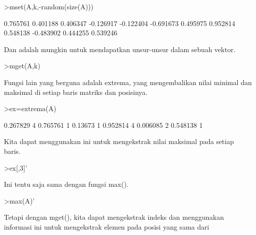\documentclass[a4paper,10pt]{article}
\begin{document}
\begin{eulernotebook}
\begin{eulercomment}
\begin{eulercomment}
\begin{eulercomment}
\begin{eulercomment}
\begin{eulercomment}
\begin{eulercomment}
\begin{eulerprompt}
>mset(A,k,-random(size(A)))
\end{eulerprompt}
\begin{euleroutput}
       0.765761      0.401188      0.406347     -0.126917 
      -0.122404     -0.691673      0.495975      0.952814 
       0.548138     -0.483902      0.444255      0.539246 
\end{euleroutput}
\begin{eulercomment}
Dan adalah mungkin untuk mendapatkan unsur-unsur dalam sebuah vektor.
\end{eulercomment}
\begin{eulerprompt}
>mget(A,k)
\end{eulerprompt}
\begin{euleroutput}
  [0.267829,  0.13673,  0.390567,  0.006085]
\end{euleroutput}
\begin{eulercomment}
Fungsi lain yang berguna adalah extrema, yang mengembalikan nilai
minimal dan maksimal di setiap baris matriks dan posisinya.
\end{eulercomment}
\begin{eulerprompt}
>ex=extrema(A)
\end{eulerprompt}
\begin{euleroutput}
       0.267829             4      0.765761             1 
        0.13673             1      0.952814             4 
       0.006085             2      0.548138             1 
\end{euleroutput}
\begin{eulercomment}
Kita dapat menggunakan ini untuk mengekstrak nilai maksimal pada
setiap baris.
\end{eulercomment}
\begin{eulerprompt}
>ex[,3]'
\end{eulerprompt}
\begin{euleroutput}
  [0.765761,  0.952814,  0.548138]
\end{euleroutput}
\begin{eulercomment}
Ini tentu saja sama dengan fungsi max().
\end{eulercomment}
\begin{eulerprompt}
>max(A)'
\end{eulerprompt}
\begin{euleroutput}
  [0.765761,  0.952814,  0.548138]
\end{euleroutput}
\begin{eulercomment}
Tetapi dengan mget(), kita dapat mengekstrak indeks dan menggunakan
informasi ini untuk mengekstrak elemen pada posisi yang sama dari

\end{eulercomment}
\end{eulercomment}
\end{eulercomment}
\end{eulercomment}
\end{eulercomment}
\end{eulercomment}
\end{eulercomment}
\end{eulernotebook}
\end{document}
